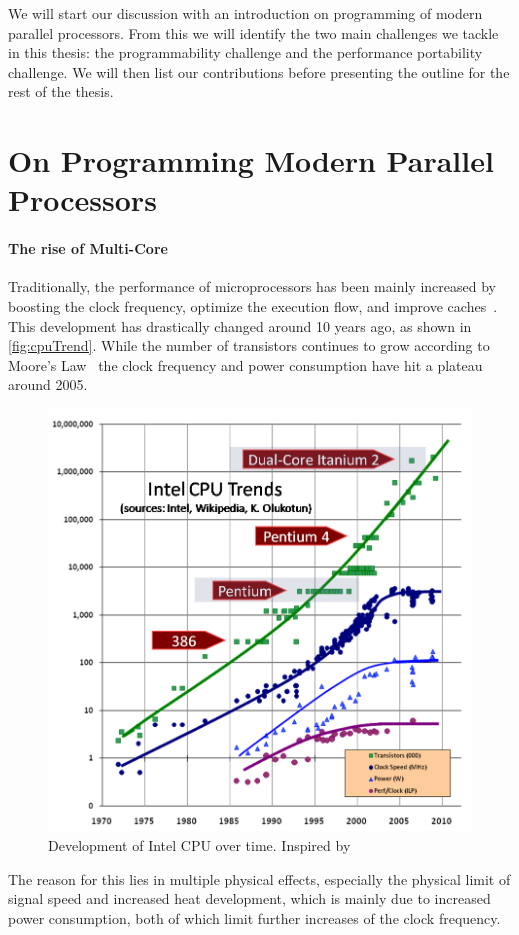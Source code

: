 We will start our discussion with an introduction on programming of modern parallel processors.
From this we will identify the two main challenges we tackle in this thesis:
the programmability challenge and the performance portability challenge.
We will then list our contributions before presenting the outline for the rest of the thesis.

\section{On Programming Modern Parallel Processors}

\paragraph{The rise of Multi-Core \CPUs}
Traditionally, the performance of microprocessors has been mainly increased by boosting the clock frequency, optimize the execution flow, and improve caches~\cite{Sutter2005}.
This development has drastically changed around 10 years ago, as shown in \autoref{fig:cpuTrend}.
While the number of transistors continues to grow according to Moore's Law~\cite{} the clock frequency and power consumption have hit a plateau around 2005.
\begin{figure}
  \centering
  \includegraphics[width=.8\linewidth]{Figures/CPU.png}
  \caption{Development of Intel CPU over time. Inspired by~\cite{Sutter2005}}
  \label{fig:cpuTrend}
\end{figure}
The reason for this lies in multiple physical effects, especially the physical limit of signal speed and increased heat development, which is mainly due to increased power consumption, both of which limit further increases of the clock frequency.
